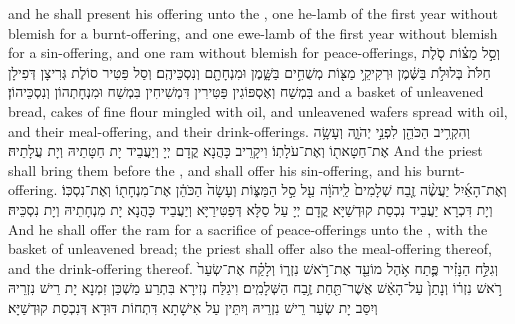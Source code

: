 {and he shall present his offering unto the \lord, one he-lamb of the first year without blemish for a burnt-offering, and one ewe-lamb of the first year without blemish for a sin-offering, and one ram without blemish for peace-offerings,}{}
{וְסַ֣ל מַצּ֗וֹת סֹ֤לֶת חַלֹּת֙ בְּלוּלֹ֣ת בַּשֶּׁ֔מֶן וּרְקִיקֵ֥י מַצּ֖וֹת מְשֻׁחִ֣ים בַּשָּׁ֑מֶן וּמִנְחָתָ֖ם וְנִסְכֵּיהֶֽם׃
}
{וְסַל פַּטִּיר סוֹלֶת גְּרִיצָן דְּפִילָן בִּמְשַׁח וְאֶסְפּוֹגִין פַּטִּירִין דִּמְשִׁיחִין בִּמְשַׁח וּמִנְחָתְהוֹן וְנִסְכֵּיהוֹן׃}
{and a basket of unleavened bread, cakes of fine flour mingled with oil, and unleavened wafers spread with oil, and their meal-offering, and their drink-offerings.}{}
{וְהִקְרִ֥יב הַכֹּהֵ֖ן לִפְנֵ֣י יְהֹוָ֑ה וְעָשָׂ֥ה אֶת־חַטָּאת֖וֹ וְאֶת־עֹלָתֽוֹ׃}
{וִיקָרֵיב כָּהֲנָא קֳדָם יְיָ וְיַעֲבֵיד יָת חַטָּתֵיהּ וְיָת עֲלָתֵיהּ׃}
{And the priest shall bring them before the \lord, and shall offer his sin-offering, and his burnt-offering.}{}
{וְאֶת־הָאַ֜יִל יַעֲשֶׂ֨ה זֶ֤בַח שְׁלָמִים֙ לַֽיהֹוָ֔ה עַ֖ל סַ֣ל הַמַּצּ֑וֹת וְעָשָׂה֙ הַכֹּהֵ֔ן אֶת־מִנְחָת֖וֹ וְאֶת־נִסְכּֽוֹ׃
}
{וְיָת דִּכְרָא יַעֲבֵיד נִכְסַת קוּדְשַׁיָּא קֳדָם יְיָ עַל סַלָּא דְּפַטִּירַיָּא וְיַעֲבֵיד כָּהֲנָא יָת מִנְחָתֵיהּ וְיָת נִסְכֵּיהּ׃}
{And he shall offer the ram for a sacrifice of peace-offerings unto the \lord, with the basket of unleavened bread; the priest shall offer also the meal-offering thereof, and the drink-offering thereof.}{}
{וְגִלַּ֣ח הַנָּזִ֗יר פֶּ֛תַח אֹ֥הֶל מוֹעֵ֖ד אֶת־רֹ֣אשׁ נִזְר֑וֹ וְלָקַ֗ח אֶת־שְׂעַר֙ רֹ֣אשׁ נִזְר֔וֹ וְנָתַן֙ עַל־הָאֵ֔שׁ אֲשֶׁר־תַּ֖חַת זֶ֥בַח הַשְּׁלָמִֽים׃
}
{וִיגַלַּח נְזִירָא בִּתְרַע מַשְׁכַּן זִמְנָא יָת רֵישׁ נִזְרֵיהּ וְיִסַּב יָת שְׂעַר רֵישׁ נִזְרֵיהּ וְיִתֵּין עַל אִישָׁתָא דִּתְחוֹת דּוּדָא דְּנִכְסַת קוּדְשַׁיָּא׃}
